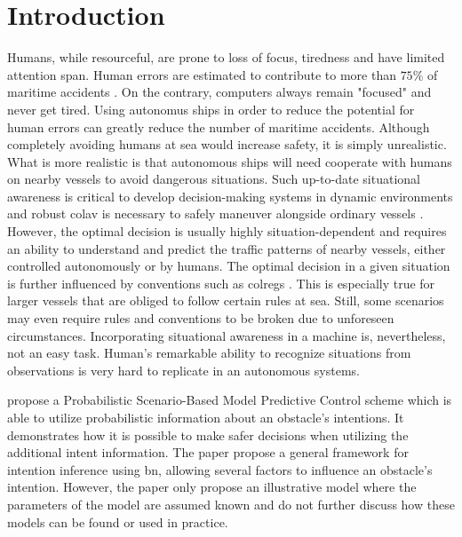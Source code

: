 \chapter{Introduction}

Humans, while resourceful, are prone to loss of focus, tiredness and have limited attention span. Human errors are estimated to contribute to more than $75\%$ of maritime accidents \cite{Tengesdal2020RiskbasedAM}. On the contrary, computers always remain "focused" and never get tired. Using autonomus ships in order to reduce the potential for human errors can greatly reduce the number of maritime accidents.
Although completely avoiding humans at sea would increase safety, it is simply unrealistic. What is more realistic is that autonomous ships will need cooperate with humans on nearby vessels to avoid dangerous situations. Such up-to-date situational awareness is critical to develop decision-making systems in dynamic environments \cite{endsley} and robust \acrfull{colav} is necessary to safely maneuver alongside ordinary vessels . However, the optimal decision is usually highly situation-dependent and requires an ability to understand and predict the traffic patterns of nearby vessels, either controlled autonomously or by humans. The optimal decision in a given situation is further influenced by conventions such as \Gls{colregs} \cite{colreg}. This is especially true for larger vessels that are obliged to follow certain rules at sea. Still, some scenarios may even require rules and conventions to be broken due to unforeseen circumstances.
Incorporating situational awareness in a machine is, nevertheless, not an easy task. Human's remarkable ability to recognize situations from observations is very hard to replicate in an autonomous systems.

 \cite{Tengesdal2020RiskbasedAM} propose a Probabilistic Scenario-Based Model Predictive Control scheme which is able to utilize probabilistic information about an obstacle's intentions. It demonstrates how it is possible to make safer decisions when utilizing the additional intent information. The paper propose a general framework for intention inference using \acrfull{bn}, allowing several factors to influence an obstacle's intention. However, the paper only propose an illustrative model where the parameters of the model are assumed known and do not further discuss how these models can be found or used in practice.  




